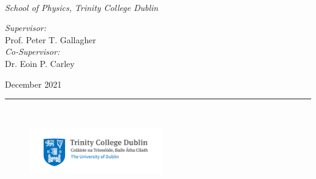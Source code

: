 \documentclass[a4paper,oneside,12pt,usenatbib]{Latex/Classes/PhDthesisPSnPDF}
\begin{document}
\vspace*{\fill}
\begin{flushright}
{ \\[1mm]
{\textnormal{\textit{School of Physics, Trinity College Dublin}}\\}

\vspace*{\fill}
\begin{flushright}
\textnormal{
\textit{Supervisor:} \\
Prof. Peter T. Gallagher}\\[0.5mm]
\textnormal{
\textit{Co-Supervisor:} \\
Dr. Eoin P. Carley}\\[0.5mm]
\end{flushright}
{December 2021}\\[5mm]
\rule{0.9\textwidth}{0.5mm}\\[4mm]
%
\begin{figure}[ht!]
\hspace{102mm}
\raggedleft
\includegraphics[height=20mm]{tcd_logo.png}
\end{figure}

}%
\end{flushright}


\frontmatter







\setcounter{secnumdepth}{3} %
\setcounter{tocdepth}{3}    %
\tableofcontents            %



\listoffigures	%


\end{document}
